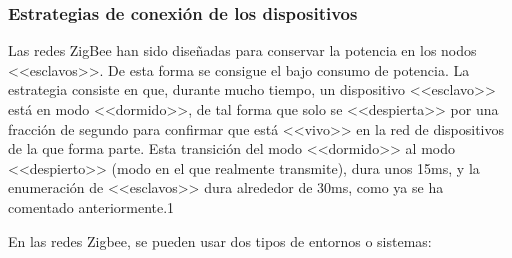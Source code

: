 \subsubsection{Estrategias de conexi\'on de los dispositivos}
Las redes ZigBee han sido dise\~nadas para conservar la potencia en los nodos <<esclavos>>. De esta forma se consigue el bajo consumo de potencia. La estrategia consiste en que, durante mucho tiempo, un dispositivo
<<esclavo>> est\'a en modo <<dormido>>, de tal forma que solo se <<despierta>> por una fracci\'on de segundo para confirmar que est\'a <<vivo>> en la red de dispositivos de la que forma parte. Esta transici\'on del modo <<dormido>> al modo <<despierto>> (modo en el que realmente transmite), dura unos 15ms, y la enumeraci\'on de <<esclavos>> dura alrededor de 30ms, como ya se ha comentado anteriormente.1

En las redes Zigbee, se pueden usar dos tipos de entornos o sistemas:

